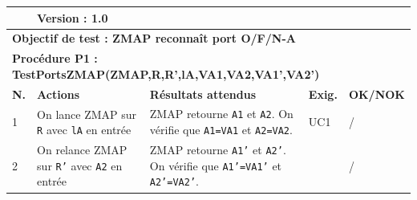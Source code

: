 \documentclass[a4paper,11pt,french]{article}
\begin{document}
\noindent
\begin{tabular}{|p{0.5cm}| p{6cm} | p{1cm} | p{4cm} | p{1.5cm}| p{1.5cm}|} 
\hline
\rowcolor{blue}
\multicolumn{2}{|l|}{\color{white}\bfseries{Objet testé : \color{white} \bfseries{ZMAP} }} & 
\multicolumn{4}{l|}{\color{white}\bfseries{Version : \color{white}\bfseries{1.0} }}\\
\hline
\multicolumn{6}{|l|}{\textbf{Objectif de test : ZMAP reconnaît port O/F/N-A} }\\
\hline
\multicolumn{6}{|l|}{\textbf{Procédure P1 : TestPortsZMAP(ZMAP,R,R',lA,VA1,VA2,VA1',VA2')} }\\
\hline
\textbf{N.} & \textbf{Actions} & \multicolumn{2}{p{5cm}|}{\textbf{Résultats attendus}} & \textbf{Exig.} & \textbf{OK/NOK} \\
\hline
1 & On lance ZMAP sur \texttt{R} avec \texttt{lA} en entrée  & \multicolumn{2}{p{6cm}|}{ZMAP retourne \texttt{A1} et \texttt{A2}. On vérifie que \texttt{A1=VA1} et \texttt{A2=VA2}. } & UC1 & / \\
\hline
2 & On relance ZMAP sur \texttt{R'} avec \texttt{A2} en entrée  & \multicolumn{2}{p{6cm}|}{ZMAP retourne \texttt{A1'} et \texttt{A2'}. On vérifie que \texttt{A1'=VA1'} et \texttt{A2'=VA2'}. } & &  / \\
\hline
\end{tabular}

%
\end{document}
